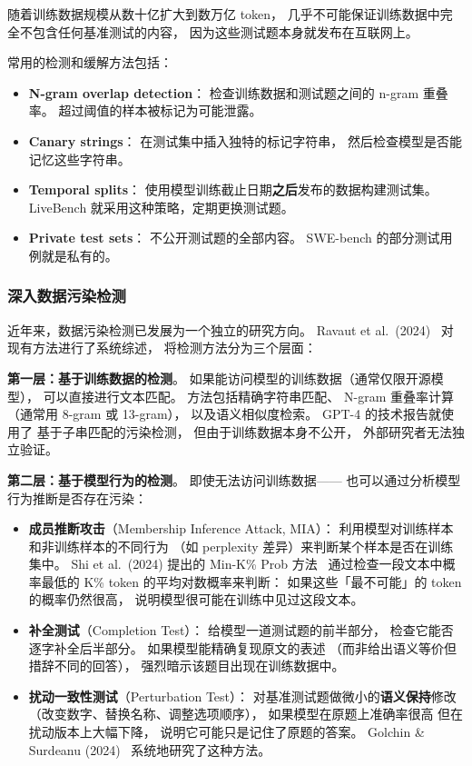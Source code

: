 随着训练数据规模从数十亿扩大到数万亿 token，
几乎不可能保证训练数据中完全不包含任何基准测试的内容，
因为这些测试题本身就发布在互联网上。

常用的检测和缓解方法包括：
\begin{itemize}[noitemsep]
  \item \textbf{N-gram overlap detection}：
        检查训练数据和测试题之间的 n-gram 重叠率。
        超过阈值的样本被标记为可能泄露。
  \item \textbf{Canary strings}：
        在测试集中插入独特的标记字符串，
        然后检查模型是否能记忆这些字符串。
  \item \textbf{Temporal splits}：
        使用模型训练截止日期\textbf{之后}发布的数据构建测试集。
        LiveBench 就采用这种策略，定期更换测试题。
  \item \textbf{Private test sets}：
        不公开测试题的全部内容。
        SWE-bench 的部分测试用例就是私有的。
\end{itemize}

\subsubsection{深入数据污染检测}

近年来，数据污染检测已发展为一个独立的研究方向。
Ravaut et al.\ (2024)~\cite{ravaut2024contamination}
对现有方法进行了系统综述，
将检测方法分为三个层面：

\textbf{第一层：基于训练数据的检测}。
如果能访问模型的训练数据（通常仅限开源模型），
可以直接进行文本匹配。
方法包括精确字符串匹配、
N-gram 重叠率计算（通常用 8-gram 或 13-gram），
以及语义相似度检索。
GPT-4 的技术报告就使用了
基于子串匹配的污染检测，
但由于训练数据本身不公开，
外部研究者无法独立验证。

\textbf{第二层：基于模型行为的检测}。
即使无法访问训练数据——
也可以通过分析模型行为推断是否存在污染：
\begin{itemize}[noitemsep]
  \item \textbf{成员推断攻击}（Membership Inference Attack, MIA）：
        利用模型对训练样本和非训练样本的不同行为
        （如 perplexity 差异）来判断某个样本是否在训练集中。
        Shi et al.\ (2024) 提出的 Min-K\% Prob 方法~\cite{shi2024detecting}
        通过检查一段文本中概率最低的 K\% token
        的平均对数概率来判断：
        如果这些「最不可能」的 token 的概率仍然很高，
        说明模型很可能在训练中见过这段文本。
  \item \textbf{补全测试}（Completion Test）：
        给模型一道测试题的前半部分，
        检查它能否逐字补全后半部分。
        如果模型能精确复现原文的表述
        （而非给出语义等价但措辞不同的回答），
        强烈暗示该题目出现在训练数据中。
  \item \textbf{扰动一致性测试}（Perturbation Test）：
        对基准测试题做微小的\textbf{语义保持}修改
        （改变数字、替换名称、调整选项顺序），
        如果模型在原题上准确率很高
        但在扰动版本上大幅下降，
        说明它可能只是记住了原题的答案。
        Golchin \& Surdeanu (2024)~\cite{golchin2024time}
        系统地研究了这种方法。
\end{itemize}

